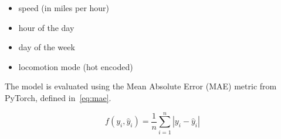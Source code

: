 \begin{itemize}
    \item speed (in miles per hour)
    \item hour of the day
    \item day of the week
    \item locomotion mode (hot encoded)
\end{itemize}

The model is evaluated using the Mean Absolute Error (MAE) metric from PyTorch, defined in~\eqref{eq:mae}.

\begin{equation}
    f(y_i, \hat{y}_i) = \frac{1}{n} \sum_{i=1}^{n} \left| y_i - \hat{y}_i \right|\label{eq:mae}
\end{equation}